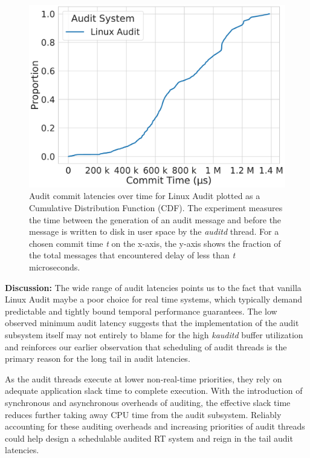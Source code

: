 \begin{figure}[t!]
    \centering
    \includegraphics[width=0.9\linewidth,keepaspectratio,scale=0.9]{fig/Commit_latencies_cdf.pdf}
    \caption{\label{fig:eval_latency}Audit commit latencies over time for Linux Audit plotted as a Cumulative Distribution Function (CDF). The experiment measures the time between the generation of an audit message and before the message is written to disk in user space by the \textit{auditd} thread. For a chosen commit time \textit{t} on the x-axis, the y-axis shows the fraction of the total messages that encountered delay of less than \textit{t} microseconds.}
\end{figure}

\textbf{Discussion:} 
The wide range of audit latencies points us to the fact that vanilla Linux Audit maybe a poor choice for real time systems, which typically demand predictable and tightly bound temporal performance guarantees. The low observed minimum audit latency suggests that the implementation of the audit subsystem itself may not entirely to blame for the high \textit{kauditd} buffer utilization and reinforces our earlier observation that scheduling of audit threads is the primary reason for the long tail in audit latencies.

As the audit threads execute at lower non-real-time priorities, they rely on adequate application slack time to complete execution. With the introduction of synchronous and asynchronous overheads of auditing, the effective slack time reduces further taking away CPU time from the audit subsystem. Reliably accounting for these auditing overheads and increasing priorities of audit threads could help design a schedulable audited RT system and reign in the tail audit latencies.

